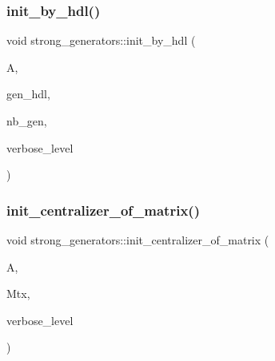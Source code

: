 \mbox{\label{classstrong__generators_abe6e1f35365f6d69d230bf0869c32596}} 
\subsubsection{\texorpdfstring{init\+\_\+by\+\_\+hdl()}{init\_by\_hdl()}}
{\footnotesize\ttfamily void strong\+\_\+generators\+::init\+\_\+by\+\_\+hdl (\begin{DoxyParamCaption}\item[{\mbox{\hyperlink{classaction}{action}} $\ast$}]{A,  }\item[{\mbox{\hyperlink{galois_8h_a09fddde158a3a20bd2dcadb609de11dc}{I\+NT}} $\ast$}]{gen\+\_\+hdl,  }\item[{\mbox{\hyperlink{galois_8h_a09fddde158a3a20bd2dcadb609de11dc}{I\+NT}}}]{nb\+\_\+gen,  }\item[{\mbox{\hyperlink{galois_8h_a09fddde158a3a20bd2dcadb609de11dc}{I\+NT}}}]{verbose\+\_\+level }\end{DoxyParamCaption})}

\mbox{\label{classstrong__generators_a7add760852a370c0aaf53d9852a84fac}} 
\subsubsection{\texorpdfstring{init\+\_\+centralizer\+\_\+of\+\_\+matrix()}{init\_centralizer\_of\_matrix()}}
{\footnotesize\ttfamily void strong\+\_\+generators\+::init\+\_\+centralizer\+\_\+of\+\_\+matrix (\begin{DoxyParamCaption}\item[{\mbox{\hyperlink{classaction}{action}} $\ast$}]{A,  }\item[{\mbox{\hyperlink{galois_8h_a09fddde158a3a20bd2dcadb609de11dc}{I\+NT}} $\ast$}]{Mtx,  }\item[{\mbox{\hyperlink{galois_8h_a09fddde158a3a20bd2dcadb609de11dc}{I\+NT}}}]{verbose\+\_\+level }\end{DoxyParamCaption})}

